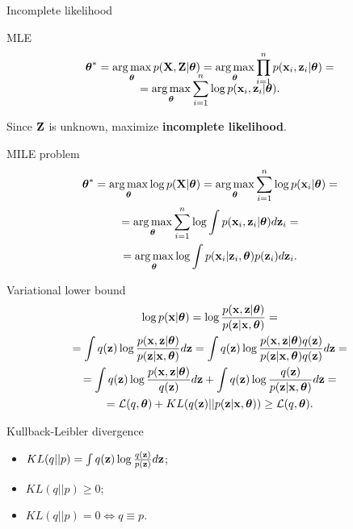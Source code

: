 \begin{frame}{Incomplete likelihood}
        \begin{block}{MLE}
            \vspace{-0.7cm}
            \begin{multline*}
                \vspace{-0.5cm}
                \btheta^* = \argmax_{\btheta} p(\bX, \bZ | \btheta) = \argmax_{\btheta} \prod_{i=1}^n p(\bx_i, \bz_i | \btheta) = \\ = \argmax_{\btheta} \sum_{i=1}^n \log p(\bx_i, \bz_i | \btheta).
            \end{multline*}
            \vspace{-0.5cm}
        \end{block}
	Since $\mathbf{Z}$ is unknown, maximize \textbf{incomplete likelihood}.
    \begin{block}{MILE problem}
        \vspace{-0.7cm}
    	\begin{multline*}
        	\boldsymbol{\theta}^* = \operatorname*{arg\,max}_{\boldsymbol{\theta}} \log p(\mathbf{X}| \boldsymbol{\theta}) = \operatorname*{arg\,max}_{\boldsymbol{\theta}} \sum_{i=1}^n \log p(\mathbf{x}_i | \boldsymbol{\theta}) = \\ =  \operatorname*{arg\,max}_{\boldsymbol{\theta}}  \sum_{i=1}^n \log \int p(\mathbf{x}_i, \mathbf{z}_i | \boldsymbol{\theta}) d \mathbf{z}_i = \\ = \operatorname*{arg\,max}_{\boldsymbol{\theta}} \log \int p(\mathbf{x}_i| \mathbf{z}_i, \boldsymbol{\theta}) p(\mathbf{z}_i) d\mathbf{z}_i.
    	\end{multline*}
	\end{block}
	
\end{frame}
\begin{frame}{Variational lower bound}
	\begin{multline*}
		\log p(\mathbf{x}| \boldsymbol{\theta}) 
		= \log \frac{p(\mathbf{x}, \mathbf{z}| \boldsymbol{\theta})}{p(\mathbf{z}|\mathbf{x}, \boldsymbol{\theta})} = \\ 
		= \int q(\mathbf{z}) \log \frac{p(\mathbf{x}, \mathbf{z}| \boldsymbol{\theta})}{p(\mathbf{z}|\mathbf{x}, \boldsymbol{\theta})}d\mathbf{z}
		= \int q(\mathbf{z}) \log \frac{p(\mathbf{x}, \mathbf{z}| \boldsymbol{\theta}) q(\mathbf{z})}{p(\mathbf{z}|\mathbf{x}, \boldsymbol{\theta}) q(\mathbf{z})} d\mathbf{z} = \\
		= \int q(\mathbf{z}) \log \frac{p(\mathbf{x}, \mathbf{z} | \boldsymbol{\theta})}{q(\mathbf{z})}d\mathbf{z} + \int q(\mathbf{z}) \log \frac{q(\mathbf{z})}{p(\mathbf{z}|\mathbf{x}, \boldsymbol{\theta})}d\mathbf{z} = \\ 
		= \mathcal{L} (q, \boldsymbol{\theta}) + KL(q(\mathbf{z}) || p(\mathbf{z}|\mathbf{x}, \boldsymbol{\theta})) \geq \mathcal{L} (q, \boldsymbol{\theta}).
	\end{multline*}
	\vspace{-0.5cm}
	\begin{block}{Kullback-Leibler divergence}
	    \begin{itemize}
	    	\item $KL(q || p) = \int q(\mathbf{z}) \log \frac{q(\mathbf{z})}{p(\mathbf{z})} d \mathbf{z}$;
	        \item $KL(q || p) \geq 0$;
	        \item $KL(q || p) = 0 \Leftrightarrow q \equiv p$.
	    \end{itemize}
	\end{block}
\end{frame}

